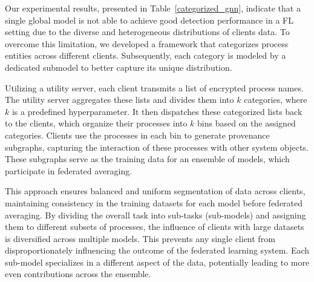 Our experimental results, presented in Table~\ref{categorized_gnn}, indicate that a single global \gnnshort model is not able to achieve good detection performance in a FL setting due to the diverse and heterogeneous distributions of clients data. To overcome this limitation, we developed a framework that categorizes process entities across different clients. Subsequently, each category is modeled by a dedicated submodel to better capture its unique distribution.

Utilizing a utility server, each client transmits a list of encrypted process names. The utility server aggregates these lists and divides them into \(k\) categories, where \(k\) is a predefined hyperparameter. It then dispatches these categorized lists back to the clients, which organize their processes into \(k\) bins based on the assigned categories. Clients use the processes in each bin to generate provenance subgraphs, capturing the interaction of these processes with other system objects. These subgraphs serve as the training data for an ensemble of \gnnshort models, which participate in federated averaging.

This approach ensures balanced and uniform segmentation of data across clients, maintaining consistency in the training datasets for each \gnnshort model before federated averaging. By dividing the overall task into sub-tasks (sub-models) and assigning them to different subsets of processes, the influence of clients with large datasets is diversified across multiple models. This prevents any single client from disproportionately influencing the outcome of the federated learning system. Each sub-model specializes in a different aspect of the data, potentially leading to more even contributions across the ensemble.

\subsection{\fpgl}
\label{sys:fpgl}


